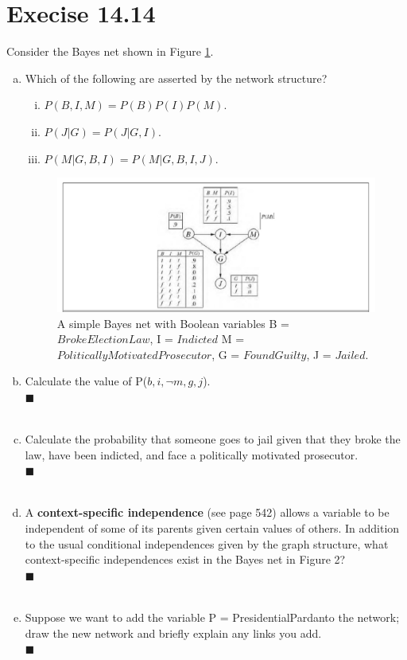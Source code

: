 \documentclass{article}
\newcommand{\solution}[1]{~\\ $\blacksquare$ \sffamily\upshape\selectfont #1
\normalfont ~\\~ }
\begin{document}
\section{Execise 14.14}
Consider the Bayes net shown in Figure \ref{fig:2}.
\begin{enumerate}[a.]
\item Which of the following are asserted by the network structure?
\begin{enumerate}[i.]
\item $ P(B,I,M)=P(B)P(I)P(M) $.
\item $ P(J|G)=P(J|G,I) $.
\item $ P(M|G,B,I)=P(M|G,B,I,J) $. 
\end{enumerate}

\begin{figure}[ht]
  \centering
  \includegraphics[width=.7\textwidth]{fig14_23.jpg}
  \caption{A simple Bayes net with Boolean variables B =
    $BrokeElectionLaw$, I = $Indicted$ M =
    $PoliticallyMotivatedProsecutor$, G = $FoundGuilty$, J = $Jailed$.
  }
  \label{fig:2}
\end{figure}

\item Calculate the value of P($b, i, \neg m, g, j$).
\solution{}
\item Calculate the probability that someone goes to jail given that
  they broke the law, have been indicted, and face a politically
  motivated prosecutor.
\solution{}
\item A \textbf{context-specific independence} (see page 542) allows a
  variable to be independent of some of its parents given certain
  values of others. In addition to the usual conditional independences
  given by the graph structure, what context-specific independences
  exist in the Bayes net in Figure 2?
  \solution{}
\item Suppose we want to add the variable P = PresidentialPardanto the
network; draw the new network and briefly explain any links you add.
\solution{}
\end{enumerate}
\end{document}
